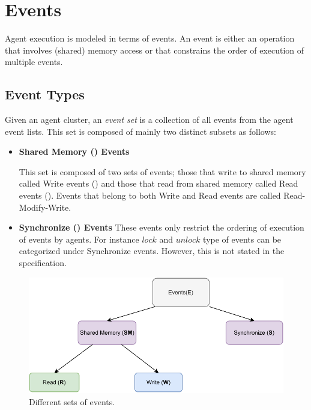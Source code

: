 \section{Events}
        
    Agent execution is modeled in terms of events. An event is either an operation that involves (shared) memory access or that constrains the order of execution of multiple events.

    \subsection{Event Types}
    
        Given an agent cluster, an \textit{event set}  is a collection of all events from the agent event lists. This set is composed of mainly two distinct subsets as follows: 

        \begin{itemize}
            \item \textbf{Shared Memory () Events}
                
                This set is composed of two sets of events; those that write to shared memory called Write events () and those that read from shared memory called Read events (). Events that belong to both Write and Read events are called Read-Modify-Write. 
            
            \item \textbf{Synchronize () Events} 
                These events only restrict the ordering of execution of events by agents. For instance $lock$ and $unlock$ type of events can be categorized under Synchronize events. However, this is not stated in the specification\footnotemark. 
    
        \end{itemize}
        
        \begin{figure}[H]
            \centering 
            \includegraphics[scale=0.7]{3.ECMAScriptMemoryModel/EventTypes.pdf}
            \caption{Different sets of events.}
        \end{figure}

